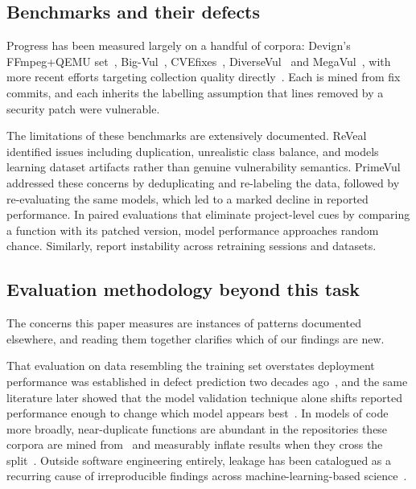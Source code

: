 \subsection{Benchmarks and their defects}
Progress has been measured largely on a handful of corpora: Devign's FFmpeg+QEMU set~\citep{zhou2019devigneffectivevulnerabilityidentification}, Big-Vul~\citep{10148758,10.1145/3379597.3387501}, CVEfixes~\citep{10.1145/3475960.3475985,bhandari2021:cvefixes}, DiverseVul~\citep{chen2023diversevulnewvulnerablesource} and
MegaVul~\citep{Ni_2024}, with more recent efforts targeting collection quality directly~\citep{wang2023reefframeworkcollectingrealworld}. Each is mined from fix commits, and each inherits the labelling assumption that lines removed by a security patch were vulnerable.

The limitations of these benchmarks are extensively documented. ReVeal~\citep{chakraborty2020deeplearningbasedvulnerability} identified issues including duplication, unrealistic class balance, and models learning dataset artifacts rather than genuine vulnerability semantics. PrimeVul~\citep{ding2024primevul} addressed these concerns by deduplicating and re-labeling the data, followed by re-evaluating the same models, which led to a marked decline in reported performance. In paired evaluations that eliminate project-level cues by comparing a function with its patched version, model performance approaches random chance. Similarly, \citet{steenhoek2023empiricalstudydeeplearning} report instability across retraining sessions and datasets.


\subsection{Evaluation methodology beyond this task}
The concerns this paper measures are instances of patterns documented elsewhere,
and reading them together clarifies which of our findings are new.

That evaluation on data resembling the training set overstates deployment
performance was established in defect prediction two decades
ago~\citep{zimmermann2009cross}, and the same literature later showed that the
model validation technique alone shifts reported performance enough to change
which model appears
best~\citep{tantithamthavorn2017empirical}. In models of code more broadly,
near-duplicate functions are abundant in the repositories these corpora are
mined from~\citep{lopes2017dejavu} and measurably inflate results when they cross
the split~\citep{allamanis2019adverse}. Outside software engineering entirely,
leakage has been catalogued as a recurring cause of irreproducible findings
across machine-learning-based science~\citep{kapoor2023leakage}.

